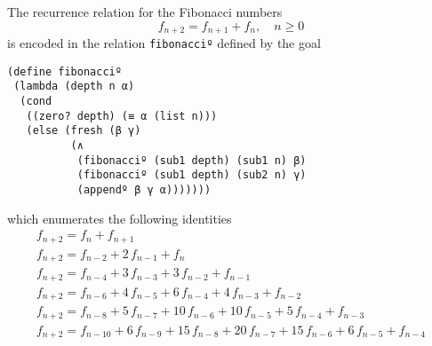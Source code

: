 \begin{example}
The recurrence relation for the Fibonacci numbers
\begin{displaymath}
f_{n+2} = f_{n+1} + f_{n}, \quad n \geq 0
\end{displaymath}
is encoded in the relation \verb|fibonacciº| defined by the goal
\begin{verbatim}
(define fibonacciº
 (lambda (depth n α)
  (cond
   ((zero? depth) (≡ α (list n)))
   (else (fresh (β γ)
          (∧
           (fibonacciº (sub1 depth) (sub1 n) β)
           (fibonacciº (sub1 depth) (sub2 n) γ)
           (appendº β γ α)))))))
\end{verbatim}
which enumerates the following identities
\begin{displaymath}
    \begin{array}{c}
      f_{n+2} = f_{n} + f_{n+1} \\
      f_{n+2} = f_{n-2} + 2\,f_{n-1} + f_{n}  \\
      f_{n+2} = f_{n-4} + 3\,f_{n-3} + 3\,f_{n-2} + f_{n-1} \\
      f_{n+2} = f_{n-6} + 4\,f_{n-5} + 6\,f_{n-4} + 4\,f_{n-3} + f_{n-2} \\
      f_{n+2} = f_{n-8} + 5\,f_{n-7} + 10\,f_{n-6} + 10\,f_{n-5} + 5\,f_{n-4} + f_{n-3} \\
      f_{n+2} = f_{n-10} + 6\,f_{n-9} +15\,f_{n-8} + 20\,f_{n-7} +15\,f_{n-6} + 6\,f_{n-5} + f_{n-4} \\
    \end{array}
\end{displaymath}
\end{example}

